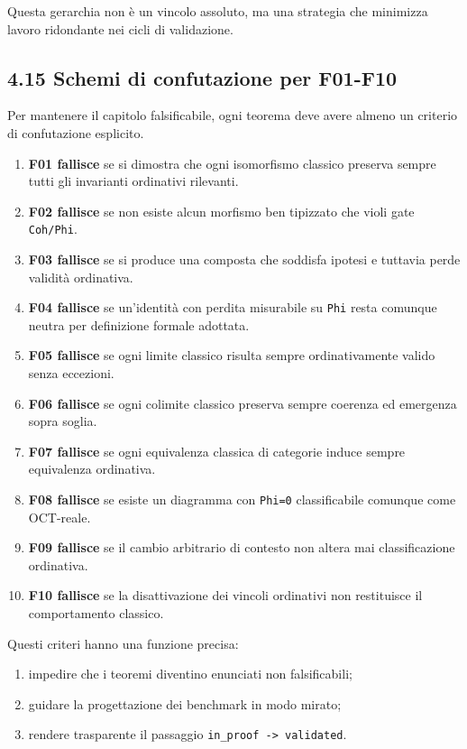 Questa gerarchia non è un vincolo assoluto, ma una strategia che minimizza lavoro ridondante nei cicli di validazione.

\subsection{4.15 Schemi di confutazione per F01-F10}

Per mantenere il capitolo falsificabile, ogni teorema deve avere almeno un criterio di confutazione esplicito.

\begin{enumerate}
\def\labelenumi{\arabic{enumi}.}
\tightlist
\item
  \textbf{F01 fallisce} se si dimostra che ogni isomorfismo classico preserva sempre tutti gli invarianti ordinativi rilevanti.
\item
  \textbf{F02 fallisce} se non esiste alcun morfismo ben tipizzato che violi gate \texttt{Coh/Phi}.
\item
  \textbf{F03 fallisce} se si produce una composta che soddisfa ipotesi e tuttavia perde validità ordinativa.
\item
  \textbf{F04 fallisce} se un'identità con perdita misurabile su \texttt{Phi} resta comunque neutra per definizione formale adottata.
\item
  \textbf{F05 fallisce} se ogni limite classico risulta sempre ordinativamente valido senza eccezioni.
\item
  \textbf{F06 fallisce} se ogni colimite classico preserva sempre coerenza ed emergenza sopra soglia.
\item
  \textbf{F07 fallisce} se ogni equivalenza classica di categorie induce sempre equivalenza ordinativa.
\item
  \textbf{F08 fallisce} se esiste un diagramma con \texttt{Phi=0} classificabile comunque come OCT-reale.
\item
  \textbf{F09 fallisce} se il cambio arbitrario di contesto non altera mai classificazione ordinativa.
\item
  \textbf{F10 fallisce} se la disattivazione dei vincoli ordinativi non restituisce il comportamento classico.
\end{enumerate}

Questi criteri hanno una funzione precisa:

\begin{enumerate}
\def\labelenumi{\arabic{enumi}.}
\tightlist
\item
  impedire che i teoremi diventino enunciati non falsificabili;
\item
  guidare la progettazione dei benchmark in modo mirato;
\item
  rendere trasparente il passaggio \texttt{in\_proof\ -\textgreater{}\ validated}.
\end{enumerate}

